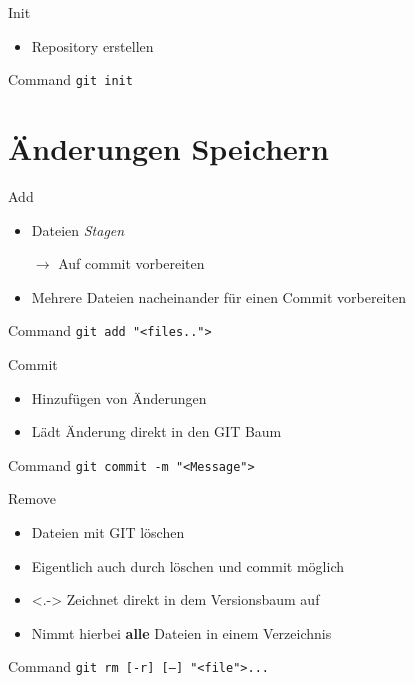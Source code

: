 \documentclass[xcolor=dvipsnames]{beamer}
\begin{document}
    \begin{frame}{Init}
      \begin{itemize}
        \item Repository erstellen
      \end{itemize}
      \begin{block}{Command}
        \texttt{git init}
      \end{block}
    \end{frame}

    \section[Ändern]{Änderungen Speichern}

    \begin{frame}{Add}
      \begin{itemize}[<+->]
        \item Dateien \textit{Stagen}
        \item[$\rightarrow$] Auf commit vorbereiten
        \item Mehrere Dateien nacheinander für einen Commit vorbereiten
      \end{itemize}
      \begin{block}{Command}
        \texttt{git add "<files..">}
      \end{block}
    \end{frame}

    \begin{frame}{Commit}
      \begin{itemize}[<+->]
        \item Hinzufügen von Änderungen
        \item Lädt Änderung direkt in den GIT Baum
      \end{itemize}
      \begin{block}{Command}
        \texttt{git commit -m "<Message"> }
      \end{block}
    \end{frame}

    \begin{frame}{Remove}
      \begin{itemize}
        \item Dateien mit GIT löschen
        \item<+-> Eigentlich auch durch löschen und commit möglich
        \item<.-> Zeichnet direkt in dem Versionsbaum auf
        \item<+-|@alert> [-r] Nimmt hierbei \textbf{alle} Dateien in einem Verzeichnis
      \end{itemize}
      \begin{block}{Command}
        \texttt{git rm [-r] [--] "<file">...}
      \end{block}
    \end{frame}
\end{document}
